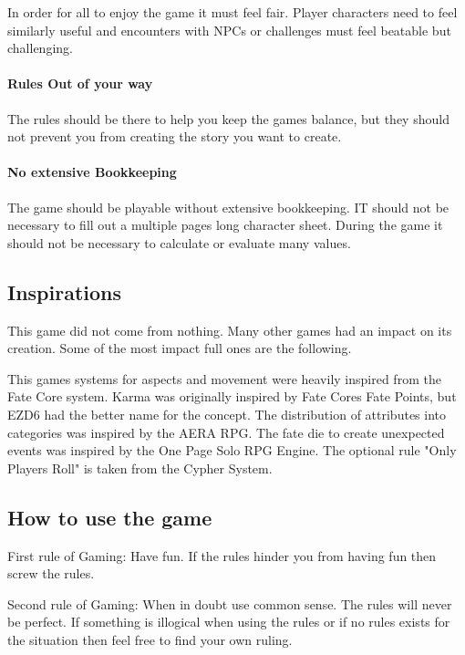 \documentclass[11pt]{article}
\begin{document}
{In order for all to enjoy the game it must feel fair. Player characters need to feel similarly useful and encounters with NPCs or challenges must feel beatable but challenging.

\paragraph*{Rules Out of your way}
\label{sec:orga5a0d92}

The rules should be there to help you keep the games balance, but they should not prevent you from creating the story you want to create.

\paragraph*{No extensive Bookkeeping}
\label{sec:orgeb736dd}

The game should be playable without extensive bookkeeping. IT should not be necessary to fill out a multiple pages long character sheet. During the game it should not be necessary to calculate or evaluate many values.

\subsection{Inspirations}
\label{sec:org38b5328}

This game did not come from nothing. Many other games had an impact on its creation. Some of the most impact full ones are the following.

This games systems for aspects and movement were heavily inspired from the Fate Core system.
Karma was originally inspired by Fate Cores Fate Points, but EZD6 had the better name for the concept.
The distribution of attributes into categories was inspired by the AERA RPG.
The fate die to create unexpected events was inspired by the One Page Solo RPG Engine.
The optional rule "Only Players Roll" is taken from the Cypher System.

\subsection{How to use the game}
\label{sec:org6c6f0e6}

First rule of Gaming: Have fun. If the rules hinder you from having fun then screw the rules.

Second rule of Gaming: When in doubt use common sense. The rules will never be perfect. If something is illogical when using the rules or if no rules exists for the situation then feel free to find your own ruling. 

}
\end{document}
